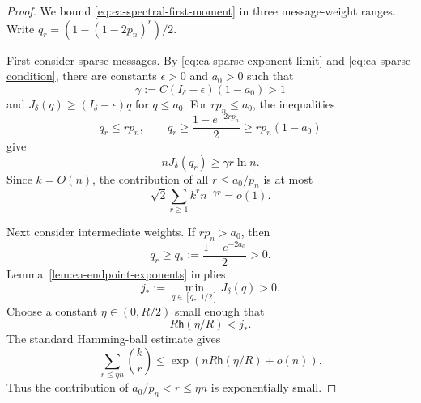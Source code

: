 \begin{proof}
We bound \eqref{eq:ea-spectral-first-moment} in three message-weight ranges.
Write $q_r=(1-(1-2p_n)^r)/2$.

First consider sparse messages.  By
\eqref{eq:ea-sparse-exponent-limit} and
\eqref{eq:ea-sparse-condition}, there are constants
$\epsilon>0$ and $a_0>0$ such that
\begin{equation}
 \gamma:=C(I_\delta-\epsilon)(1-a_0)>1
 \label{eq:ea-sparse-margin}
\end{equation}
and $J_\delta(q)\geq(I_\delta-\epsilon)q$ for $q\leq a_0$.
For $rp_n\leq a_0$, the inequalities
\begin{equation}
 q_r\leq rp_n,
 \qquad
 q_r\geq\frac{1-e^{-2rp_n}}{2}
       \geq rp_n(1-a_0)
 \label{eq:ea-qr-sparse-bounds}
\end{equation}
give
\begin{equation}
 nJ_\delta(q_r)\geq\gamma r\ln n.
 \label{eq:ea-sparse-tail-sum-exponent}
\end{equation}
Since $k=O(n)$, the contribution of all $r\leq a_0/p_n$ is at most
\begin{equation}
 \sqrt{2}\sum_{r\geq 1}k^r n^{-\gamma r}=o(1).
 \label{eq:ea-sparse-tail-sum}
\end{equation}

Next consider intermediate weights.  If $rp_n>a_0$, then
\begin{equation}
 q_r\geq q_*:=\frac{1-e^{-2a_0}}{2}>0.
 \label{eq:ea-intermediate-q}
\end{equation}
Lemma~\ref{lem:ea-endpoint-exponents} implies
\begin{equation}
 j_*:=\min_{q\in[q_*,1/2]}J_\delta(q)>0.
 \label{eq:ea-intermediate-rate}
\end{equation}
Choose a constant $\eta\in(0,R/2)$ small enough that
\begin{equation}
 R\mathsf{h}(\eta/R)<j_*.
 \label{eq:ea-intermediate-eta}
\end{equation}
The standard Hamming-ball estimate gives
\begin{equation}
 \sum_{r\leq\eta n}\binom{k}{r}
 \leq\exp\left(nR\mathsf{h}(\eta/R)+o(n)\right).
 \label{eq:ea-intermediate-message-count}
\end{equation}
Thus the contribution of $a_0/p_n<r\leq\eta n$ is exponentially small.


\end{proof}
